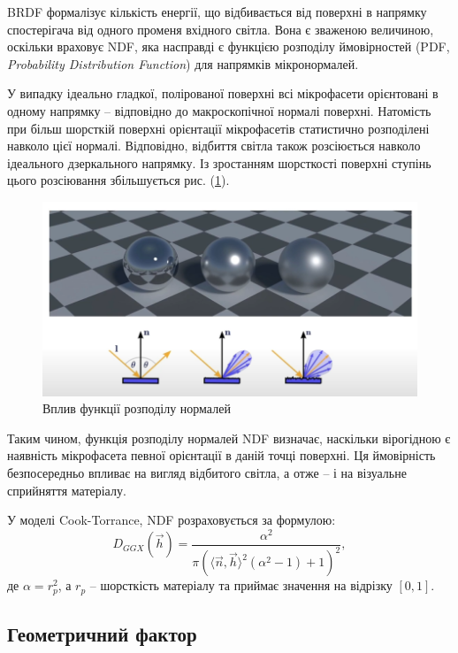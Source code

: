 BRDF формалізує кількість енергії, що відбивається від поверхні в напрямку спостерігача від одного променя вхідного світла. Вона є зваженою величиною, оскільки 
враховує NDF, яка насправді є функцією розподілу ймовірностей (PDF, \textit{Probability Distribution Function}) для напрямків мікронормалей.

У випадку ідеально гладкої, полірованої поверхні всі мікрофасети орієнтовані в одному напрямку -- відповідно до макроскопічної нормалі поверхні. Натомість 
при більш шорсткій поверхні орієнтації мікрофасетів статистично розподілені навколо цієї нормалі. Відповідно, відбиття світла також розсіюється навколо ідеального
 дзеркального напрямку. Із зростанням шорсткості поверхні ступінь цього розсіювання збільшується рис. (\ref{fig:NDF}).

  \begin{figure}[h]
  \centering
  \includegraphics[scale=1]{Pictures/NDF.png}
  \caption{Вплив функції розподілу нормалей}
  \label{fig:NDF}
\end{figure}

Таким чином, функція розподілу нормалей NDF визначає, наскільки вірогідною є наявність мікрофасета певної орієнтації в даній точці поверхні. Ця ймовірність 
безпосередньо впливає на вигляд відбитого світла, а отже -- і на візуальне сприйняття матеріалу.
\par 
  У моделі Cook-Torrance, NDF розраховується за формулою:
\begin{equation}
  D_{GGX}(\vec{h})=\frac{\alpha^2}{\pi(\langle\vec{n},\vec{h}\rangle^2(\alpha^2-1)+1)^2},
\end{equation}
де $\alpha = r_p^2$, а $r_p$ -- шорсткість матеріалу та приймає значення на відрізку $[0,1]$.

\subsection{Геометричний фактор}\\

